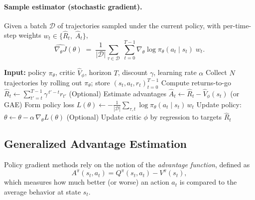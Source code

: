 \paragraph{Sample estimator (stochastic gradient).}
Given a batch $\mathcal{D}$ of trajectories sampled under the current policy, with per-time-step weights $w_t \in \{\hat R_t,\;\hat A_t\}$,
\[
\widehat{\nabla_\theta J}(\theta)
\;=\;
\frac{1}{|\mathcal{D}|}\sum_{\tau\in\mathcal{D}}\;\sum_{t=0}^{T-1}
\nabla_\theta \log \pi_\theta(a_t\mid s_t)\; w_t.
\]

\begin{algorithm}[H]
\caption{\textsc{Reinforce} with Reward-to-Go and Baseline}
\label{alg:reinforce}
\begin{algorithmic}[1]
\State \textbf{Input:} policy $\pi_\theta$, critic $\hat V_\phi$, horizon $T$, discount $\gamma$, learning rate $\alpha$
\Repeat
  \State Collect $N$ trajectories by rolling out $\pi_\theta$; store $(s_t,a_t,r_t)_{t=0}^{T-1}$
    \State Compute returns-to-go $\hat R_t \gets \sum_{t'=t}^{T-1} \gamma^{\,t'-t} r_{t'}$
    \State (Optional) Estimate advantages $\hat A_t \gets \hat R_t - \hat V_\phi(s_t)$ (or GAE)
  \EndFor
  \State Form policy loss $L(\theta) \gets -\frac{1}{|\mathcal{D}|}\!\sum\limits_{\tau,t} \log \pi_\theta(a_t\mid s_t)\, w_t$
  \State Update policy: $\theta \leftarrow \theta - \alpha\, \nabla_\theta L(\theta)$
  \State (Optional) Update critic $\phi$ by regression to targets $\hat R_t$
\end{algorithmic}
\end{algorithm}



\subsection{Generalized Advantage Estimation}

Policy gradient methods rely on the notion of the \emph{advantage function}, defined as
\begin{equation}
    A^\pi(s_t,a_t) = Q^\pi(s_t,a_t) - V^\pi(s_t),
\end{equation}
which measures how much better (or worse) an action $a_t$ is compared to the average behavior at state $s_t$.

